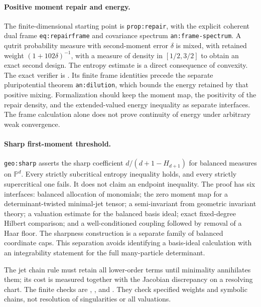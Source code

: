 \paragraph{Positive moment repair and energy.}
The finite-dimensional starting point is \texttt{prop:repair}, with
the explicit coherent dual frame \texttt{eq:repairframe} and covariance
spectrum \texttt{an:frame-spectrum}. A qutrit probability measure with
second-moment error $\delta$ is mixed, with retained weight
$(1+102\delta)^{-1}$, with a measure of density in $[1/2,3/2]$ to obtain
an exact second design. The entropy estimate is a direct consequence of
convexity. The exact verifier is
.
Its finite frame identities precede the separate pluripotential theorem
\texttt{an:dilution}, which bounds the energy retained by that positive
mixing. Formalization should keep the moment map, the positivity of the
repair density, and the extended-valued energy inequality as separate
interfaces. The frame calculation alone does not prove continuity of
energy under arbitrary weak convergence.

\paragraph{Sharp first-moment threshold.}
\texttt{geo:sharp} asserts the sharp coefficient
$d/(d+1-H_{d+1})$ for balanced measures on $\mathbb P^d$.
Every strictly subcritical entropy inequality holds, and every strictly
supercritical one fails. It does not claim an endpoint inequality.
The proof has six interfaces: balanced allocation of monomials;
the zero moment map for a determinant-twisted minimal-jet tensor;
a semi-invariant from geometric invariant theory; a valuation estimate
for the balanced basis ideal; exact fixed-degree Hilbert comparison;
and a well-conditioned coupling followed by removal of a Haar floor.
The sharpness construction is a separate family of balanced coordinate
caps. This separation avoids identifying a basis-ideal calculation with
an integrability statement for the full many-particle determinant.

The jet chain rule must retain all lower-order terms until minimality
annihilates them; its cost is measured together with the Jacobian
discrepancy on a resolving chart. The finite checks are
,
, and
.
They check specified weights and symbolic chains, not resolution of
singularities or all valuations.

